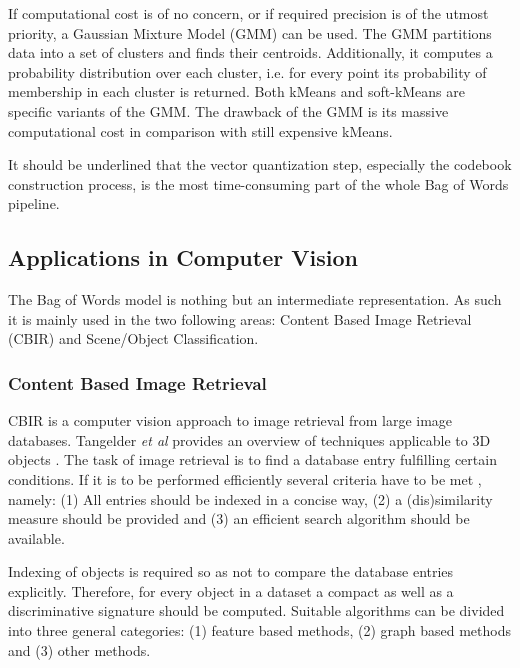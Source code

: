 		If computational cost is of no concern, or if required precision is of the utmost priority, a Gaussian Mixture Model (GMM) can be used. The GMM partitions data into a set of clusters and finds their centroids. Additionally, it computes a probability distribution over each cluster, i.e. for every point its probability of membership in each cluster is returned. Both kMeans and soft-kMeans are specific variants of the GMM. The drawback of the GMM is its massive computational cost in comparison with still expensive kMeans.		
		
		It should be underlined that the vector quantization step, especially the codebook construction process, is the most time-consuming part of the whole Bag of Words pipeline.
	
	\subsection{Applications in Computer Vision}
	The Bag of Words model is nothing but an intermediate representation. As such it is mainly used in the two following areas: Content Based Image Retrieval (CBIR) and Scene/Object Classification.
	
		\subsubsection{Content Based Image Retrieval}
		CBIR is a computer vision approach to image retrieval from large image databases. Tangelder \emph{et al} provides an overview of techniques applicable to 3D objects \cite{tangelder2008survey}. The task of image retrieval is to find a database entry fulfilling certain conditions. If it is to be performed efficiently several criteria have to be met \cite{toldo2009bag}, namely: (1) All entries should be indexed in a concise way, (2) a (dis)similarity measure should be provided and (3) an efficient search algorithm should be available. 
		
		Indexing of objects is required so as not to compare the database entries explicitly. Therefore, for every object in a dataset a compact as well as a discriminative signature should be computed. Suitable algorithms can be divided into three general categories: (1) feature based methods, (2) graph based methods and (3) other methods.

